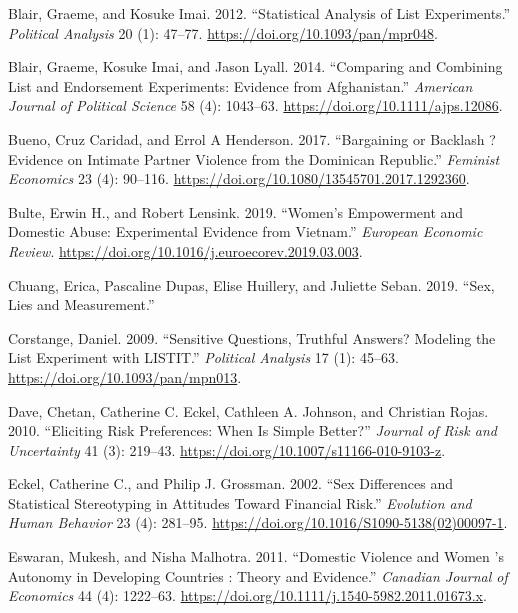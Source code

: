 \documentclass[
]{article}
\newlength{\cslhangindent}
\newenvironment{CSLReferences}[2] %
 {\begin{list}{}{%
  \setlength{\itemindent}{0pt}
  \setlength{\leftmargin}{0pt}
  \setlength{\parsep}{0pt}
  \ifodd #1
   \setlength{\leftmargin}{\cslhangindent}
   \setlength{\itemindent}{-1\cslhangindent}
  \fi
  \setlength{\itemsep}{#2\baselineskip}}}
 {\end{list}}
\begin{document}
\begin{CSLReferences}{1}{0}
Blair, Graeme, and Kosuke Imai. 2012. {``Statistical {Analysis} of {List
Experiments}.''} \emph{Political Analysis} 20 (1): 47--77.
\url{https://doi.org/10.1093/pan/mpr048}.

Blair, Graeme, Kosuke Imai, and Jason Lyall. 2014. {``Comparing and
Combining List and Endorsement Experiments: {Evidence} from
{Afghanistan}.''} \emph{American Journal of Political Science} 58 (4):
1043--63. \url{https://doi.org/10.1111/ajps.12086}.

Bueno, Cruz Caridad, and Errol A Henderson. 2017. {``Bargaining or
{Backlash} ? {Evidence} on {Intimate Partner Violence} from the
{Dominican Republic}.''} \emph{Feminist Economics} 23 (4): 90--116.
\url{https://doi.org/10.1080/13545701.2017.1292360}.

Bulte, Erwin H., and Robert Lensink. 2019. {``Women's Empowerment and
Domestic Abuse: {Experimental} Evidence from {Vietnam}.''}
\emph{European Economic Review}.
\url{https://doi.org/10.1016/j.euroecorev.2019.03.003}.

Chuang, Erica, Pascaline Dupas, Elise Huillery, and Juliette Seban.
2019. {``Sex, {Lies} and {Measurement}.''}

Corstange, Daniel. 2009. {``Sensitive Questions, Truthful Answers?
{Modeling} the List Experiment with {LISTIT}.''} \emph{Political
Analysis} 17 (1): 45--63. \url{https://doi.org/10.1093/pan/mpn013}.

Dave, Chetan, Catherine C. Eckel, Cathleen A. Johnson, and Christian
Rojas. 2010. {``Eliciting Risk Preferences: {When} Is Simple Better?''}
\emph{Journal of Risk and Uncertainty} 41 (3): 219--43.
\url{https://doi.org/10.1007/s11166-010-9103-z}.

Eckel, Catherine C., and Philip J. Grossman. 2002. {``Sex Differences
and Statistical Stereotyping in Attitudes Toward Financial Risk.''}
\emph{Evolution and Human Behavior} 23 (4): 281--95.
\url{https://doi.org/10.1016/S1090-5138(02)00097-1}.

Eswaran, Mukesh, and Nisha Malhotra. 2011. {``Domestic Violence and
Women 's Autonomy in Developing Countries : Theory and Evidence.''}
\emph{Canadian Journal of Economics} 44 (4): 1222--63.
\url{https://doi.org/10.1111/j.1540-5982.2011.01673.x}.


\end{CSLReferences}
\end{document}
